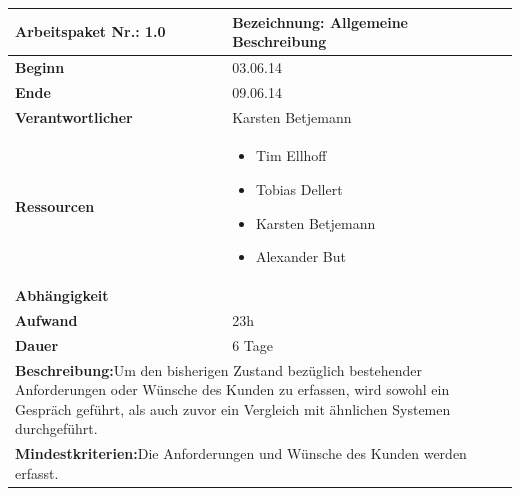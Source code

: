 \documentclass[fontsize=12pt,paper=a4,twoside]{scrartcl}
\begin{document}
	\begin{tabular}{|p{5.3cm}|p{9.7cm}|}\hline
		\textbf{Arbeitspaket Nr.:} 1.0 & \textbf{Bezeichnung:} Allgemeine Beschreibung\\  \hline \hline
		\textbf{Beginn} & 03.06.14\\ \hline
		\textbf{Ende} & 09.06.14\\ \hline
		\textbf{Verantwortlicher} & Karsten Betjemann\\ \hline
		\textbf{Ressourcen} & \begin{itemize}
			\item Tim Ellhoff
			\item Tobias Dellert
			\item Karsten Betjemann
			\item Alexander But
		\end{itemize}    \\ \hline
		\textbf{Abhängigkeit} & \\ \hline
		\textbf{Aufwand} & 23h \\ \hline
		\textbf{Dauer} & 6 Tage\\ \hline
		\multicolumn{2}{|p{15cm}|}{\textbf{Beschreibung:}\newline Um den bisherigen Zustand bezüglich bestehender Anforderungen oder Wünsche des Kunden zu erfassen, wird sowohl ein Gespräch geführt, als auch zuvor ein Vergleich mit ähnlichen Systemen durchgeführt.   }\\ \hline
		\multicolumn{2}{|p{15cm}|}{\textbf{Mindestkriterien:}\newline Die Anforderungen und Wünsche des Kunden werden erfasst.}\\ \hline
	\end{tabular}
	
	\begin{verbatim} 
	\end{verbatim}
	
\end{document}
